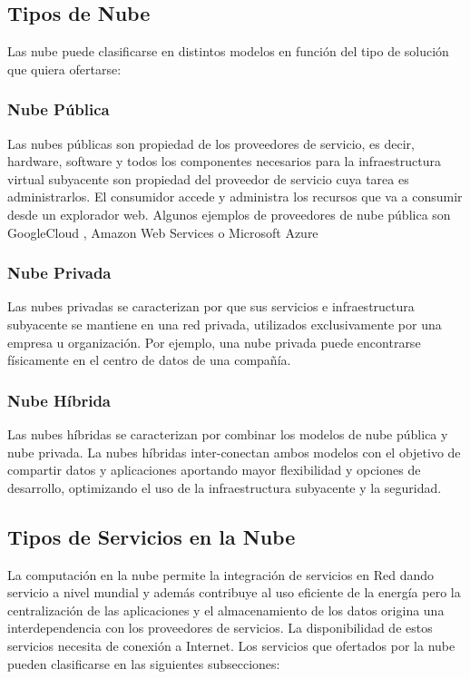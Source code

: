 \documentclass[a4paper,11pt]{book}
\begin{document}
\subsection{Tipos de Nube}

Las nube puede clasificarse en distintos modelos en función del tipo de solución que quiera ofertarse:

\subsubsection{Nube Pública}

Las nubes públicas son propiedad de los proveedores de servicio, es decir, hardware, software y todos los componentes necesarios para la infraestructura virtual subyacente son propiedad del proveedor de servicio cuya tarea es administrarlos. El consumidor accede y administra los recursos que va a consumir desde un explorador web.  Algunos ejemplos de proveedores de nube pública son GoogleCloud\cite{gcp} , Amazon Web Services\cite{aws} o Microsoft Azure\cite{azure}

\subsubsection{Nube Privada}
Las nubes privadas se caracterizan por que sus servicios e infraestructura subyacente se mantiene en una red privada, utilizados exclusivamente por una empresa u organización. Por ejemplo, una nube privada puede encontrarse físicamente en el centro de datos de una compañía.

\subsubsection{Nube Híbrida}

Las nubes híbridas se caracterizan por combinar los modelos de nube pública y nube privada. La nubes híbridas inter-conectan ambos modelos con el objetivo de compartir datos y aplicaciones aportando mayor flexibilidad y opciones de desarrollo, optimizando el uso de la infraestructura subyacente y la seguridad.


\subsection{Tipos de Servicios en la Nube}

La computación en la nube permite la integración de servicios en Red dando servicio a nivel mundial y además contribuye al uso eficiente de la energía pero la centralización de las aplicaciones y el almacenamiento de los datos origina una interdependencia con los proveedores de servicios. La disponibilidad de estos servicios necesita de conexión a Internet. Los servicios que ofertados por la nube pueden clasificarse en las siguientes subsecciones:
\end{document}
